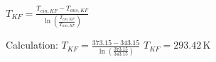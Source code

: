 \( T_{KF} = \frac{T_{ein, KF} - T_{aus, KF}}{\ln \left( \frac{T_{ein, KF}}{T_{aus, KF}} \right)} \)  

Calculation:  
\( T_{KF} = \frac{373.15 - 343.15}{\ln \left( \frac{373.15}{343.15} \right)} \)  
\( T_{KF} = 293.42 \, \text{K} \)